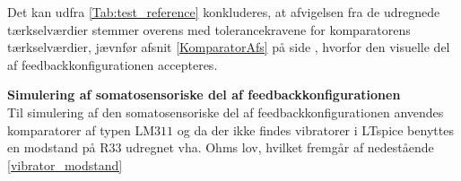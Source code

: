 
\noindent Det kan udfra \ref{Tab:test_reference} konkluderes, at afvigelsen fra de udregnede tærkselværdier stemmer overens med tolerancekravene for komparatorens tærkselværdier, jævnfør afsnit \ref{KomparatorAfs} på side \pageref{KomparatorAfs}, hvorfor den visuelle del af feedbackkonfigurationen accepteres. 

\noindent\textbf{Simulering af somatosensoriske del af feedbackkonfigurationen} \\
Til simulering af den somatosensoriske del af feedbackkonfigurationen anvendes komparatorer af typen LM$311$ og da der ikke findes vibratorer i LTspice benyttes en modstand på R$33$ udregnet vha. Ohms lov, hvilket fremgår af nedestående \eqref{vibrator_modstand} 

